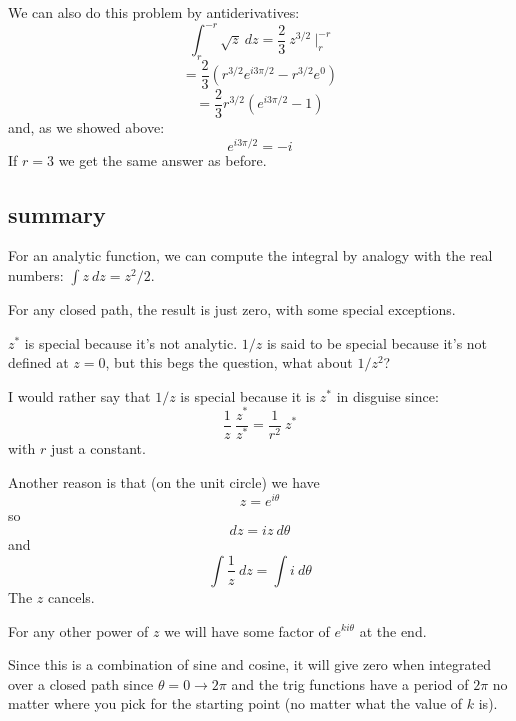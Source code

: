 \documentclass[11pt, oneside]{article}
\begin{document}
We can also do this problem by antiderivatives:
\[ \int_r^{-r} \sqrt{z} \ dz = \frac{2}{3} \ z^{3/2} \ \bigg |_r^{-r}  \]
\[ = \frac{2}{3} ( r^{3/2} e^{i3\pi/2} - r^{3/2} e^0) \]
\[ = \frac{2}{3} r^{3/2} ( e^{i3\pi/2} - 1) \]
and, as we showed above:
\[ e^{i3\pi/2} = -i \]
If $r=3$ we get the same answer as before.

\subsection*{summary}

For an analytic function, we can compute the integral by analogy with the real numbers:  $\int z \ dz = z^2/2$.

For any closed path, the result is just zero, with some special exceptions.

$z^*$ is special because it's not analytic.  $1/z$ is said to be special because it's not defined at $z = 0$, but this begs the question, what about $1/z^2$?

I would rather say that $1/z$ is special because it is $z^*$ in disguise since:
\[ \frac{1}{z} \ \frac{z^*}{z^*} = \frac{1}{r^2} \ z^* \]
with $r$ just a constant.

Another reason is that (on the unit circle) we have
\[ z = e^{i \theta} \]
so
\[ dz = i z \ d \theta \]
and
\[ \int \frac{1}{z} \ dz = \int i \ d \theta \]
The $z$ cancels.

For any other power of $z$ we will have some factor of $e^{ki\theta}$ at the end.  

Since this is a combination of sine and cosine, it will give zero when integrated over a closed path since $\theta = 0 \rightarrow 2 \pi$ and the trig functions have a period of $2 \pi$ no matter where you pick for the starting point (no matter what the value of $k$ is).
\end{document}
